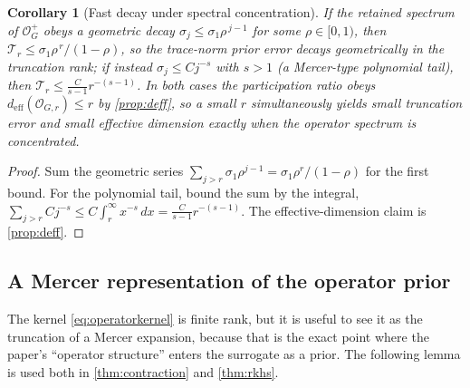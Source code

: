 \documentclass[aps,prxquantum,reprint,amsmath,amssymb,floatfix,nofootinbib,superscriptaddress,longbibliography]{revtex4-2}
\newtheorem{corollary}{Corollary}
\theoremstyle{remark}
\newcommand{\calO}{\mathcal{O}}
\begin{document}
\begin{corollary}[Fast decay under spectral concentration]
\label{cor:decay}
If the retained spectrum of \(\calO_G^{+}\) obeys a geometric decay
\(\sigma_j\le\sigma_1\rho^{\,j-1}\) for some \(\rho\in[0,1)\), then
\(\mathcal T_r\le \sigma_1\rho^{\,r}/(1-\rho)\), so the trace-norm prior error
decays geometrically in the truncation rank; if instead
\(\sigma_j\le C j^{-s}\) with \(s>1\) (a Mercer-type polynomial tail), then
\(\mathcal T_r\le \tfrac{C}{s-1}r^{-(s-1)}\).  In both cases the participation
ratio obeys \(d_{\mathrm{eff}}(\calO_{G,r})\le r\) by \cref{prop:deff}, so a small
\(r\) simultaneously yields small truncation error and small effective dimension
exactly when the operator spectrum is concentrated.
\end{corollary}
\begin{proof}
Sum the geometric series \(\sum_{j>r}\sigma_1\rho^{j-1}=\sigma_1\rho^{r}/(1-\rho)\)
for the first bound.  For the polynomial tail, bound the sum by the integral,
\(\sum_{j>r}Cj^{-s}\le C\int_{r}^{\infty}x^{-s}\,dx=\tfrac{C}{s-1}r^{-(s-1)}\).
The effective-dimension claim is \cref{prop:deff}.
\end{proof}

\subsection{A Mercer representation of the operator prior}
\label{sec:mercer}

The kernel \eqref{eq:operatorkernel} is finite rank, but it is useful to see it
as the truncation of a Mercer expansion, because that is the exact point where the
paper's ``operator structure'' enters the surrogate as a prior. The following
lemma is used both in \cref{thm:contraction} and \cref{thm:rkhs}.
\end{document}
